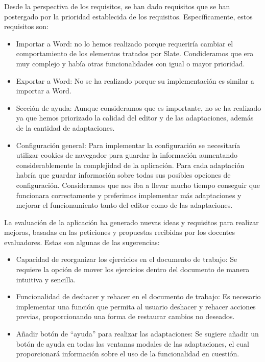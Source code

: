 Desde la perspectiva de los requisitos, se han dado requisitos que se han postergado por la prioridad establecida de los requisitos. Específicamente, estos requisitos son:
\begin{itemize}
    \item Importar a Word: no lo hemos realizado porque requeriría cambiar el comportamiento de los elementos tratados por Slate. Condideramos que era muy complejo y había otras funcionalidades con igual o mayor prioridad.
    \item Exportar a Word: No se ha realizado porque su implementación es similar a importar a Word.
    \item Sección de ayuda: Aunque consideramos que es importante, no se ha realizado ya que hemos priorizado la calidad del editor y de las adaptaciones, además de la cantidad de adaptaciones.
    \item Configuración general: Para implementar la configuración se necesitaría utilizar cookies de navegador para guardar la información aumentando considerablemente la complejidad de la aplicación. Para cada adaptación habría que guardar información sobre todas sus posibles opciones de configuración. Consideramos que nos iba a llevar mucho tiempo conseguir que funcionara correctamente y preferimos implementar más adaptaciones y mejorar el funcionamiento tanto del editor como de las adaptaciones.
\end{itemize}

La evaluación de la aplicación ha generado nuevas ideas y requisitos para realizar mejoras, basadas en las peticiones y propuestas recibidas por los docentes evaluadores. Estas son algunas de las sugerencias:

\begin{itemize}
    \item Capacidad de reorganizar los ejercicios en el documento de trabajo: Se requiere la opción de mover los ejercicios dentro del documento de manera intuitiva y sencilla.
    \item Funcionalidad de deshacer y rehacer en el documento de trabajo: Es necesario implementar una función que permita al usuario deshacer y rehacer acciones previas, proporcionando una forma de restaurar cambios no deseados.
    \item Añadir botón de ``ayuda'' para realizar las adaptaciones: Se sugiere añadir un botón de ayuda en todas las ventanas modales de las adaptaciones, el cual proporcionará información sobre el uso de la funcionalidad en cuestión.
\end{itemize}